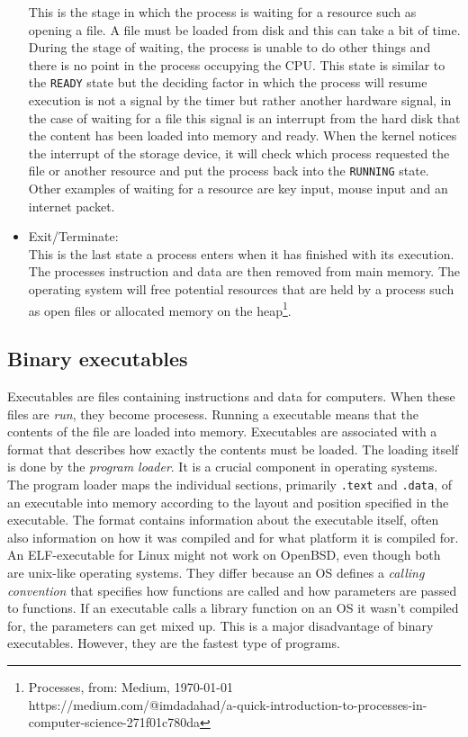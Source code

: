 \begin{itemize}
This is the stage in which the process is waiting for a resource such as opening a file. A file must be loaded from disk and this can take a bit of time.
During the stage of waiting, the process is unable to do other things and there is no point in the process occupying the CPU. This state is similar
to the \texttt{READY} state but the deciding factor in which the process will resume execution is not a signal by the timer but rather another hardware
signal, in the case of waiting for a file this signal is an interrupt from the hard disk that the content has been loaded into memory and ready. When
the kernel notices the interrupt of the storage device, it will check which process requested the file or another resource and put the process back into
the \texttt{RUNNING} state. Other examples of waiting for a resource are key input, mouse input and an internet packet.
\item Exit/Terminate: \\
This is the last state a process enters when it has finished with its execution. The processes instruction and data are then removed
from main memory. The operating system will free potential resources that are held by a process such as open files or allocated memory on the
heap\footnote{Processes, from: Medium, \today \\ https://medium.com/@imdadahad/a-quick-introduction-to-processes-in-computer-science-271f01c780da}.

\end{itemize}

\subsection{Binary executables}

Executables are files containing instructions and data for computers. When these files are \textit{run}, they
become procesess. Running a executable means that the contents of the file are loaded into memory. Executables
are associated with a format that describes how exactly the contents must be loaded. The loading itself
is done by the \textit{program loader}. It is a crucial component in operating systems. The program loader
maps the individual sections, primarily \texttt{.text} and \texttt{.data}, of an executable into memory according to the layout and position
specified in the executable. The format contains information about the executable itself, often also information on
how it was compiled and for what platform it is compiled for. An ELF-executable for Linux might not work on OpenBSD,
even though both are unix-like operating systems. They differ because an OS defines a \textit{calling convention} that
specifies how functions are called and how parameters are passed to functions. If an executable calls a library function on
an OS it wasn't compiled for, the parameters can get mixed up. This is a major disadvantage of binary executables. However,
they are the fastest type of programs.


